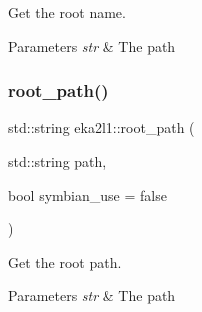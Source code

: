 Get the root name. 


\begin{DoxyParams}{Parameters}
{\em str} & The path \\
\hline
\end{DoxyParams}
\mbox{\label{namespaceeka2l1_a688a1ae105b53fe9fbf00d73231f4e73}} 
\subsubsection{\texorpdfstring{root\+\_\+path()}{root\_path()}}
{\footnotesize\ttfamily std\+::string eka2l1\+::root\+\_\+path (\begin{DoxyParamCaption}\item[{std\+::string}]{path,  }\item[{bool}]{symbian\+\_\+use = {\ttfamily false} }\end{DoxyParamCaption})}



Get the root path. 


\begin{DoxyParams}{Parameters}
{\em str} & The path \\
\hline
\end{DoxyParams}
